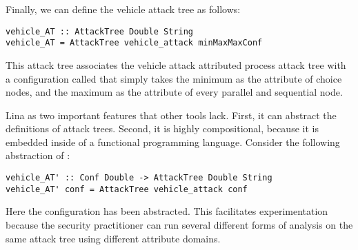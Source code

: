 Finally, we can define the vehicle attack tree as follows:
\begin{verbatim}
vehicle_AT :: AttackTree Double String
vehicle_AT = AttackTree vehicle_attack minMaxMaxConf
\end{verbatim}
This attack tree associates the vehicle attack attributed process
attack tree with a configuration called  that simply
takes the minimum as the attribute of choice nodes, and the maximum as
the attribute of every parallel and sequential node.

Lina as two important features that other tools lack.  First, it can
abstract the definitions of attack trees. Second, it is highly
compositional, because it is embedded inside of a functional
programming language.  Consider the following abstraction of
:
\begin{verbatim}
vehicle_AT' :: Conf Double -> AttackTree Double String
vehicle_AT' conf = AttackTree vehicle_attack conf
\end{verbatim}
Here the configuration has been abstracted.  This facilitates
experimentation because the security practitioner can run several
different forms of analysis on the same attack tree using different
attribute domains.

